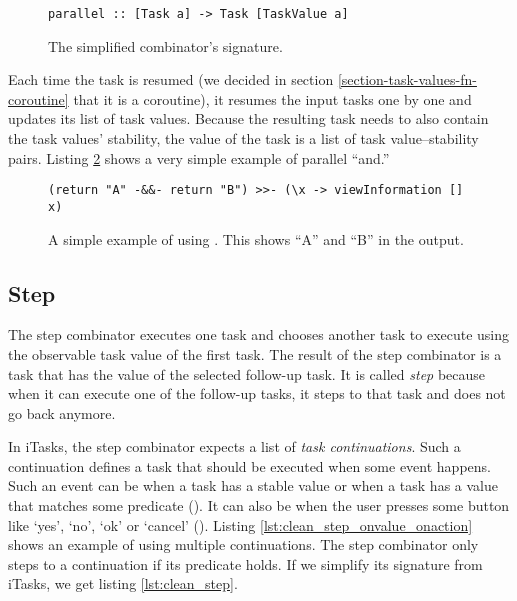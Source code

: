 \begin{figure}[ht]
\centering
\begin{verbatim}
parallel :: [Task a] -> Task [TaskValue a]
\end{verbatim}
\caption{The simplified  combinator's signature.}
\label{lst:clean_parallel}
\end{figure}

Each time the  task is resumed (we decided in section \ref{section-task-values-fn-coroutine} that it is a coroutine), it resumes the input tasks one by one and updates its list of task values. Because the resulting task needs to also contain the task values' stability, the value of the  task is a list of task value--stability pairs. Listing \ref{lst:clean_parallel_example} shows a very simple example of parallel ``and.''

\begin{figure}[ht]
\centering
\begin{verbatim}
(return "A" -&&- return "B") >>- (\x -> viewInformation [] x)
\end{verbatim}
\caption{A simple example of using . This shows ``A'' and ``B'' in the output.}
\label{lst:clean_parallel_example}
\end{figure}

\subsection{Step}
The step combinator executes one task and chooses another task to execute using the observable task value of the first task. The result of the step combinator is a task that has the value of the selected follow-up task. It is called \textit{step} because when it can execute one of the follow-up tasks, it steps to that task and does not go back anymore.

In iTasks, the step combinator expects a list of \textit{task continuations}. Such a continuation defines a task that should be executed when some event happens. Such an event can be when a task has a stable value or when a task has a value that matches some predicate (). It can also be when the user presses some button like `yes', `no', `ok' or `cancel' (). Listing \ref{lst:clean_step_onvalue_onaction} shows an example of using multiple  continuations. The step combinator only steps to a continuation if its predicate holds. If we simplify its signature from iTasks, we get listing \ref{lst:clean_step}.

